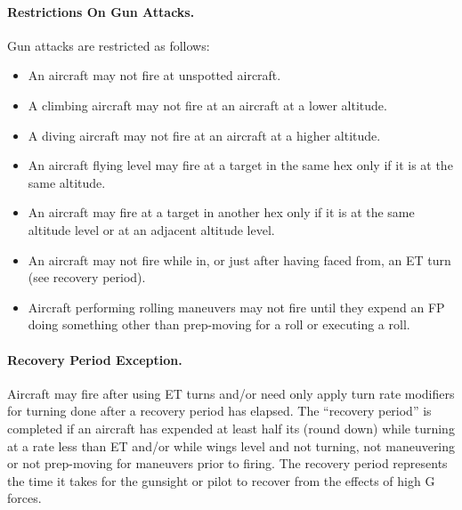 \paragraph{Restrictions On Gun Attacks.} Gun attacks are restricted as follows:

\begin{itemize}
    \item An aircraft may not fire at unspotted aircraft.
    \item A climbing aircraft may not fire at an aircraft at a lower altitude.
    \item A diving aircraft may not fire at an aircraft at a higher altitude.
    \item An aircraft flying level may fire at a target in the same hex only if it is at the same altitude.
    \item An aircraft  may fire at a target in another hex only if it is at the same altitude level or at an adjacent altitude level.
    \item An aircraft may not fire while in, or just after having faced from, an ET turn (see recovery period).
    \item Aircraft performing rolling maneuvers may not fire until they expend an FP doing something other than prep-moving for a roll or executing a roll.
\end{itemize}

\paragraph{Recovery Period Exception.} Aircraft may fire after using ET turns and/or need only apply turn rate modifiers for turning done after a recovery period has elapsed. The “recovery period” is completed if an aircraft has expended at least half its  (round down) while turning at a rate less than ET and/or while wings level and not turning, not maneuvering or not prep-moving for maneuvers prior to firing. The recovery period represents the time it takes for the gunsight or pilot to recover from the effects of high G forces. 


